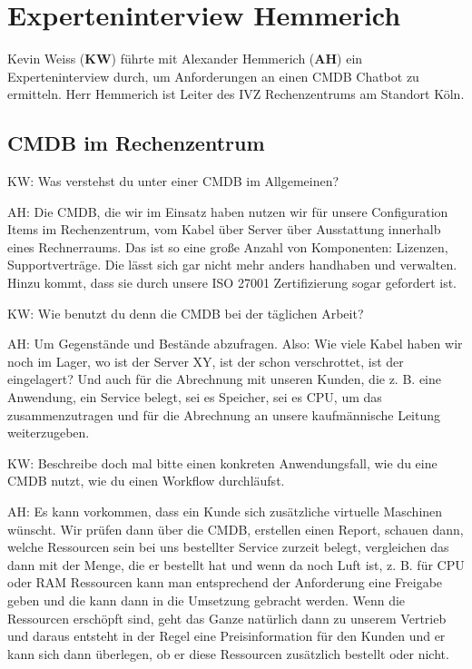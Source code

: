 \chapter{Experteninterview Hemmerich}\label{Interview_Hemmerich}

Kevin Weiss (\textbf{KW}) führte mit Alexander Hemmerich (\textbf{AH}) ein Experteninterview  durch, um Anforderungen an einen CMDB Chatbot zu ermitteln. Herr Hemmerich ist Leiter des IVZ Rechenzentrums am Standort Köln.

\section*{CMDB im Rechenzentrum}

\begin{list}{X:}{\setlength{\labelsep}{5mm}}
\item[KW:] Was verstehst du unter einer CMDB im Allgemeinen?
\item[AH:] Die CMDB, die wir im Einsatz haben nutzen wir für unsere Configuration Items im Rechenzentrum, vom Kabel über Server über Ausstattung innerhalb eines Rechnerraums. Das ist so eine große Anzahl von Komponenten: Lizenzen, Supportverträge. Die lässt sich gar nicht mehr anders handhaben und verwalten. Hinzu kommt, dass sie durch unsere ISO 27001 Zertifizierung sogar gefordert ist.
\item[KW:] Wie benutzt du denn die CMDB bei der täglichen Arbeit?
\item [AH:] Um Gegenstände und Bestände abzufragen. Also: Wie viele Kabel haben wir noch im Lager, wo ist der Server XY, ist der schon verschrottet, ist der eingelagert? Und auch für die Abrechnung mit unseren Kunden, die z. B. eine Anwendung, ein Service belegt, sei es Speicher, sei es CPU, um das zusammenzutragen und für die Abrechnung an unsere kaufmännische Leitung weiterzugeben. 
\item [KW:] Beschreibe doch mal bitte einen konkreten Anwendungsfall, wie du eine CMDB nutzt, wie du einen Workflow durchläufst.
\item [AH:] Es kann vorkommen, dass ein Kunde sich zusätzliche virtuelle Maschinen wünscht. Wir prüfen dann über die CMDB, erstellen einen Report, schauen dann, welche Ressourcen sein bei uns bestellter Service zurzeit belegt, vergleichen das dann mit der Menge, die er bestellt hat und wenn da noch Luft ist, z. B. für CPU oder RAM Ressourcen kann man entsprechend der Anforderung eine Freigabe geben und die kann dann in die Umsetzung gebracht werden. Wenn die Ressourcen erschöpft sind, geht das Ganze natürlich dann zu unserem Vertrieb und daraus entsteht in der Regel eine Preisinformation für den Kunden und er kann sich dann überlegen, ob er diese Ressourcen zusätzlich bestellt oder nicht.

\end{list}
